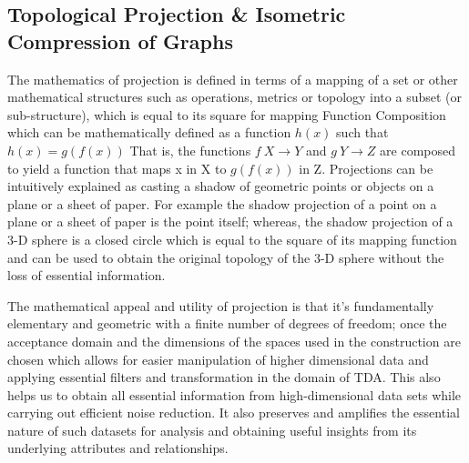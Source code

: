 \subsection{Topological Projection \& Isometric Compression of Graphs}

The mathematics of projection\cite{12.1_2002topologicalInvariaceProjection} is defined in terms of a mapping of a set or other mathematical structures such as operations, metrics or topology into a subset (or sub-structure), which is equal to its square for mapping Function  Composition  which can be mathematically defined as a function $h(x)$ such that $h(x) = g(f(x))$ That is, the functions $f \: X \rightarrow Y$ and $g \: Y \rightarrow Z$ are composed to yield a function that maps x in X to $g(f(x))$ in Z.\cite{12.2_ProjectionMath}  Projections can be intuitively explained as casting a shadow of  geometric points or objects  on a plane or a sheet of paper. For example the shadow projection of a point on a plane or a sheet of paper is the point itself; whereas, the shadow projection of a 3-D sphere is a closed circle which is equal to the square of its mapping function and can be used to obtain the original topology of the 3-D sphere without the loss of essential information.\cite{12.0_alatorre2018TDAinvariant}

The mathematical appeal and utility of projection is that it's fundamentally elementary and geometric with a finite number of degrees of freedom; once the acceptance domain and the dimensions of the spaces used in the construction are chosen which allows for easier manipulation of higher dimensional data and applying essential filters and transformation in the domain of TDA. This also helps us to obtain all essential information from high-dimensional data sets while carrying out efficient noise reduction. It also preserves and amplifies the essential nature of such datasets for analysis and obtaining useful insights from its underlying attributes and relationships.\cite{01.0_2010introductionTopoPropertiesInvariance}\cite{02.3_2017introductionTDA} \cite{02.4_TDAResearch}

